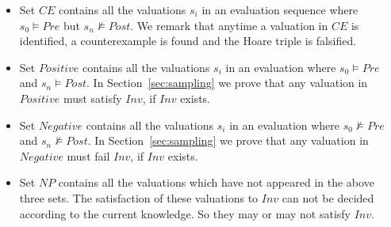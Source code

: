 \begin{itemize}
    \item Set $\mathit{CE}$ contains all the valuations $s_i$ in an evaluation sequence where $\mathit{s_0 \models \mathit{Pre}}$ but $\mathit{s_n \not\models \mathit{Post}}$. We remark that anytime a valuation in $\mathit{CE}$ is identified, a counterexample is found and the Hoare triple is falsified.
    \item Set $\mathit{Positive}$ contains all the valuations $s_i$ in an evaluation where $\mathit{s_0 \models \mathit{Pre}}$ and $\mathit{s_n \models \mathit{Post}}$. In Section~\ref{sec:sampling} we prove that any valuation in $\mathit{Positive}$ must satisfy $\mathit{Inv}$, if $\mathit{Inv}$ exists.
    \item Set $\mathit{Negative}$ contains all the valuations $s_i$ in an evaluation where $\mathit{s_0 \not\models \mathit{Pre}}$ and $\mathit{s_n \not\models \mathit{Post}}$. In Section~\ref{sec:sampling} we prove that any valuation in $\mathit{Negative}$ must fail $\mathit{Inv}$, if $\mathit{Inv}$ exists.
    \item Set $\mathit{NP}$ contains all the valuations which have not appeared in the above three sets. The satisfaction of these valuations to $\mathit{Inv}$ can not be decided according to the current knowledge. So they may or may not satisfy $\mathit{Inv}$.
\end{itemize}
